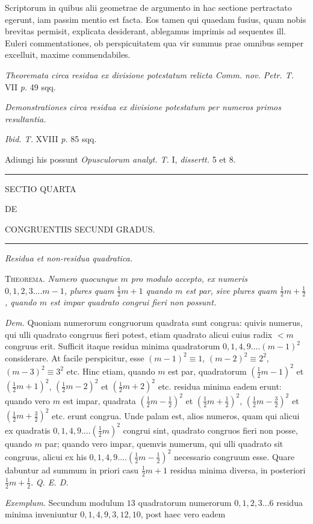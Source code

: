 
Scriptorum in quibus alii geometrae de argumento in hac sectione pertractato egerunt, iam passim mentio est facta. Eos tamen qui quaedam fusius, quam nobis brevitas permisit, explicata desiderant, ablegamus imprimis ad sequentes ill. Euleri commentationes, ob perspicuitatem qua vir summus prae omnibus semper excelluit, maxime commendabiles.

\emph{Theoremata circa residua ex divisione potestatum relicta Comm. nov. Petr. T.} VII \emph{p.} 49 sqq.

\emph{Demonstrationes circa residua ex divisione potestatum per numeros primos resultantia.}\par
\hspace*{\parindent}\emph{Ibid. T.} XVIII \emph{p.} 85 sqq.

Adiungi his possunt \emph{Opusculorum analyt. T.} I, \emph{dissertt.} 5 et 8.

\begin{center}\rule{.28\linewidth}{.25pt}\end{center}

\clearpage
{}
\begin{center}
{\Large SECTIO QUARTA}\par\bigskip
{\small DE}\par\bigskip
{\Large CONGRUENTIIS SECUNDI GRADUS.}
\end{center}

\begin{center}\rule{.09\linewidth}{.25pt}\end{center}

\begin{center}\small\emph{Residua et non-residua quadratica.}\end{center}


\textsc{Theorema.} \emph{Numero quocunque $m$ pro modulo accepto, ex numeris $0,1,2,3....m-1$, plures quam $\tfrac12m+1$ quando $m$ est par, sive plures quam $\tfrac12m+\tfrac12$, quando $m$ est impar quadrato congrui fieri non possunt.}

\emph{Dem.} Quoniam numerorum congruorum quadrata sunt congrua: quivis numerus, qui ulli quadrato congruus fieri potest, etiam quadrato alicui cuius radix $<m$ congruus erit. Sufficit itaque residua minima quadratorum $0,1,4,9....(m-1)^2$ considerare. At facile perspicitur, esse $(m-1)^2\equiv1$, $(m-2)^2\equiv2^2$, $(m-3)^2\equiv3^2$
etc. Hinc etiam, quando $m$ est par, quadratorum $(\tfrac12m-1)^2$ et $(\tfrac12m+1)^2$, $(\tfrac12m-2)^2$ et $(\tfrac12m+2)^2$ etc. residua minima eadem erunt: quando vero $m$ est impar, quadrata $(\tfrac12m-\tfrac12)^2$ et $(\tfrac12m+\tfrac12)^2$, $(\tfrac12m-\tfrac32)^2$ et $(\tfrac12m+\tfrac32)^2$ etc. erunt congrua. Unde
palam est, alios numeros, quam qui alicui ex quadratis $0,1,4,9....(\tfrac12m)^2$ congrui sint, quadrato congruos fieri non posse, quando $m$ par; quando vero impar, quemvis numerum, qui ulli quadrato sit congruus, alicui ex his $0,1,4,9....(\tfrac12m-\tfrac12)^2$ necessario congruum esse. Quare dabuntur ad summum in priori casu $\tfrac12m+1$ residua minima diversa, in posteriori $\tfrac12m+\tfrac12$. \emph{Q. E. D.}

\emph{Exemplum.} Secundum modulum $13$ quadratorum numerorum $0,1,2,3...6$ residua minima inveniuntur $0,1,4,9,3,12,10$, post haec vero eadem

